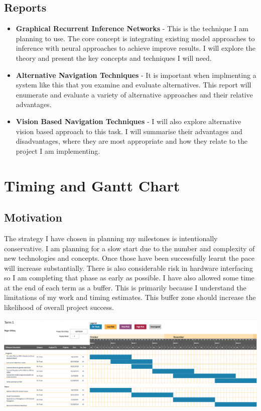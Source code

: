 \documentclass[]{../resources/final_report}
\begin{document}
\subsection{Reports}
\begin{itemize}
  \item \textbf{Graphical Recurrent Inference Networks} - This is the technique I am planning to use. The core concept is integrating existing model approaches to inference with neural approaches to achieve improve results. I will explore the theory and present the key concepts and techniques I will need.
  \item \textbf{Alternative Navigation Techniques} - It is important when implmenting a system like this that you examine and evaluate alternatives. This report will enumerate and evaluate a variety of alternative approaches and their relative advantages.
  \item \textbf{Vision Based Navigation Techniques} - I will also explore alternative vision based approach to this task. I will summarise their advantages and disadvantages, where they are most appropriate and how they relate to the project I am implementing.
\end{itemize}

\newpage

\section{Timing and Gantt Chart}

\subsection{Motivation}
The strategy I have chosen in planning my milestones is intentionally conservative. I am planning for a slow start due to the number and complexity of new technologies and concepts. Once those have been successfully learnt the pace will increase substantially.
There is also considerable risk in hardware interfacing so I am completing that phase as early as possible.
\linebreak
\linebreak
I have also allowed some time at the end of each term as a buffer. This is primarily because I understand the limitations of my work and timing estimates. This buffer zone should increase the likelihood of overall project success.
\vspace{20pt}

\includegraphics[width=\textwidth]{../resources/images/Term1GanttChart.png}
\end{document}
